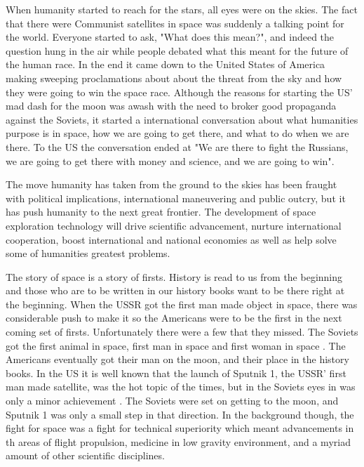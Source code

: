 \documentclass[a4paper,12pt]{article}
\title{}
\author{John Curry\\
        C0409094\\
        History 108\\
        Camosun College\\
        }
\date{\today}
\begin{document}
\maketitle

When humanity started to reach for the stars, all eyes were on the skies. The fact that there were Communist satellites in space was suddenly a talking point for the world. Everyone started to ask, "What does this mean?", and indeed the question hung in the air while people debated what this meant for the future of the human race. In the end it came down to the United States of America making sweeping proclamations about about the threat from the sky and how they were going to win the space race. Although the reasons for starting the US' mad dash for the moon was awash with the need to broker good propaganda against the Soviets, it started a international conversation about what humanities purpose is in space, how we are going to get there, and what to do when we are there. To the US the conversation ended at "We are there to fight the Russians, we are going to get there with money and science, and we are going to win". 

The move humanity has taken from the ground to the skies has been fraught with political implications, international maneuvering and public outcry, but it has push humanity to the next great frontier. The development of space exploration technology will drive scientific advancement, nurture international cooperation, boost international and national economies as well as help solve some of humanities greatest problems. 

The story of space is a story of firsts. History is read to us from the beginning and those who are to be written in our history books want to be there right at the beginning. When the USSR got the first man made object in space, there was considerable push to make it so the Americans were to be the first in the next coming set of firsts. Unfortunately there were a few that they missed. The Soviets got the first animal in space, first man in space and first woman in space \autocite{west2001}. The Americans eventually got their man on the moon, and their place in the history books. In the US it is well known that the launch of Sputnik 1, the USSR' first man made satellite, was the hot topic of the times, but in the Soviets eyes in was only a minor achievement \autocite{west2001}. The Soviets were set on getting to the moon, and Sputnik 1 was only a small step in that direction. In the background though, the fight for space was a fight for technical superiority which meant advancements in th areas of flight propulsion, medicine in low gravity environment, and a myriad amount of other scientific disciplines. 
\end{document}
